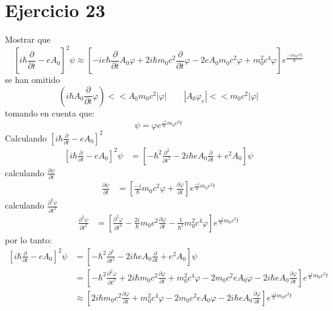 \section*{Ejercicio 23}
Mostrar que 
\begin{equation*}
    \left[i\hbar \frac{\partial}{\partial t} -eA_0\right]^2 \psi \approx \left[-i e \hbar \frac{\partial }{\partial t} A_0 \varphi+2i\hbar m_0c^2 \frac{\partial}{\partial t}\varphi-2eA_0m_0c^2\varphi +m_0^2c^4 \varphi \right]e^{\frac{-im_0c^2t}{\hbar}}
\end{equation*}
se han omitido 
\begin{equation*}
    (i\hbar A_0 \frac{\partial}{\partial t}\varphi) << A_0 m_0c^2 |\varphi| \qquad |A_0\varphi_e| << m_0c^2 |\varphi|
\end{equation*}
tomando en cuenta que:
\begin{equation*}
    \psi=\varphi e^{\frac{-i}{\hbar}m_0c^2t}
\end{equation*}
Calculando $\left[i\hbar \frac{\partial}{\partial t} -eA_0\right]^2$
\begin{align*}
    \left[i\hbar \frac{\partial}{\partial t} -eA_0\right]^2\psi &=\left[-\hbar^2\frac{\partial^2}{\partial t^2}-2i\hbar e A_0 \frac{\partial}{\partial t}+e^2A_0\right]\psi
\end{align*}
calculando $\frac{\partial \psi }{\partial t}$
\begin{align*}
    \frac{\partial \psi }{\partial t} &= \left[\frac{-i}{\hbar}m_0c^2 \varphi+ \frac{\partial \varphi}{\partial t}\right] e^{\frac{-i}{\hbar}m_0c^2t}
\end{align*}
calculando $\frac{\partial^2 \psi }{\partial t^2}$
\begin{align*}
    \frac{\partial^2 \psi }{\partial t^2} &= \left[\frac{\partial^2 \varphi}{ \partial t^2}-\frac{2i}{\hbar}m_0c^2\frac{\partial \varphi}{\partial t}-\frac{1}{\hbar^2}m_0^2c^4 \varphi\right] e^{\frac{-i}{\hbar}m_0c^2t}
\end{align*}
por lo tanto:
\begin{align*}
    \left[i\hbar \frac{\partial}{\partial t} -eA_0\right]^2\psi &=\left[-\hbar^2\frac{\partial^2}{\partial t^2}-2i\hbar e A_0 \frac{\partial}{\partial t}+e^2A_0\right]\psi\\
    &=\left[-\hbar^2\frac{\partial^2 \varphi}{ \partial t^2}+2i\hbar m_0c^2\frac{\partial \varphi}{\partial t}+m_0^2c^4 \varphi -2m_0c^2eA_0\varphi - 2i \hbar e A_0 \frac{\partial \varphi}{\partial t}\right] e^{\frac{-i}{\hbar}m_0c^2t}\\
    & \approx \left[2i\hbar m_0c^2\frac{\partial \varphi}{\partial t}+m_0^2c^4 \varphi -2m_0c^2eA_0\varphi - 2i \hbar e A_0 \frac{\partial \varphi}{\partial t}\right] e^{\frac{-i}{\hbar}m_0c^2t}
\end{align*}